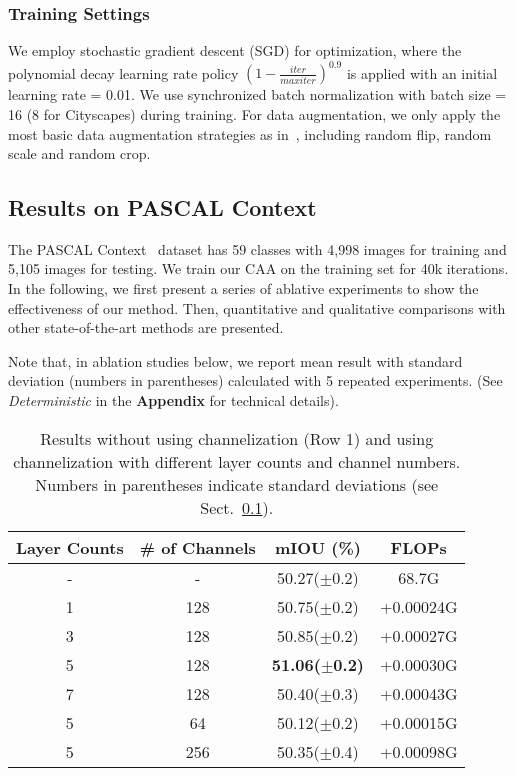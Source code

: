 \documentclass[letterpaper]{article} \usepackage{aaai22}  \usepackage{times}  \usepackage{helvet}  \usepackage{courier}  \usepackage[hyphens]{url}  \usepackage{graphicx} \urlstyle{rm} \def\UrlFont{\rm}  \usepackage{natbib}  \usepackage{caption} \DeclareCaptionStyle{ruled}{labelfont=normalfont,labelsep=colon,strut=off} \frenchspacing  \setlength{\pdfpagewidth}{8.5in}  \setlength{\pdfpageheight}{11in}  \usepackage{algorithm}
\begin{document}
\subsubsection{Training Settings} 
We employ stochastic gradient descent (SGD) for optimization, where the polynomial decay learning rate policy $ (1 - \frac{iter}{max iter})^{0.9} $ is applied with an initial learning rate = 0.01. We use synchronized batch normalization with batch size = 16 (8 for Cityscapes) during training.
For data augmentation, we only apply the most basic data augmentation strategies as in~\cite{cDeepLabV3Plus}, including random flip, random scale and random crop.

\subsection{Results on PASCAL Context}
\label{expAblation}

The PASCAL Context~\cite{cPascalContext} dataset has 59 classes with 4,998 images for training and 5,105 images for testing. 
We train our CAA on the training set for 40k iterations.
In the following, we first present a series of ablative experiments to show the effectiveness of our method. 
Then, quantitative and qualitative comparisons with other state-of-the-art methods are presented.

Note that, in ablation studies below, we report mean result with standard deviation (numbers in parentheses) calculated with 5 repeated experiments. (See \textit{Deterministic} in the \textbf{Appendix} for technical details).
\begin{table}[t]
	\centering
	\small
	\begin{tabular}{c|c|c|c} 
		\toprule[1pt]
		\multicolumn{1}{c|}{Layer Counts} &\multicolumn{1}{c|}{\# of Channels} & mIOU (\%) & FLOPs \\
		\midrule[0.5pt]
		\midrule[0.5pt]
		-& -& 50.27($\pm$0.2)&  68.7G\\
		\midrule
		1&128& 50.75($\pm$0.2)& +0.00024G\\
		3&128& 50.85($\pm$0.2) & +0.00027G\\
		5&128& \textbf{51.06($\pm$0.2)} & +0.00030G \\
		7&128& 50.40($\pm$0.3)  & +0.00043G \\
		\midrule
		5&64& 50.12($\pm$0.2)& +0.00015G\\
		5&256 & 50.35($\pm$0.4) & +0.00098G \\
		\bottomrule[1pt]
	\end{tabular}
	\caption{ Results without using channelization (Row 1) and using channelization with different layer counts and channel numbers. Numbers in parentheses indicate standard deviations (see Sect.~\ref{expAblation}).}
	\label{table:cdp}
\end{table}
\end{document}
